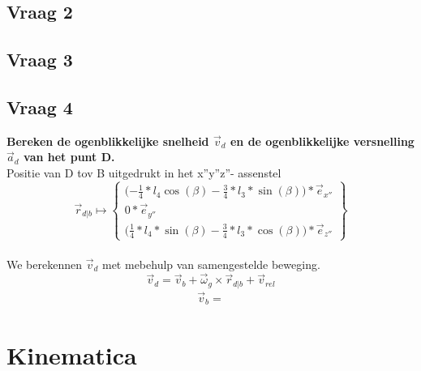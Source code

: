 \documentclass[a4paper,10pt]{article}
\begin{document}
\subsection{Vraag 2}

\subsection{Vraag 3}


\subsection{Vraag 4}
\textbf{Bereken de ogenblikkelijke snelheid $\vec{v}_d$ en de ogenblikkelijke versnelling $\vec{a}_d$ van het punt D.}\\
Positie van D tov B uitgedrukt in het x''y''z''- assenstel\\
\begin{equation}
	\vec{r}_{d|b} \mapsto \begin{Bmatrix}
	\Big({-\frac{1}{4}} * l_4 \cos(\beta)-\frac{3}{4}*l_3*\sin(\beta)\Big)*\vec{e}_{x''}\\
	0 * \vec{e}_{y''}\\
	\Big (\frac{1}{4}*l_4 *\sin(\beta) - \frac{3}{4}*l_3*\cos(\beta)\Big) * \vec{e}_{z''}
	\end{Bmatrix}
\end{equation}\\
We berekennen $\vec{v}_d$ met mebehulp van samengestelde beweging.\\
\begin{equation}
\vec{v}_d = \vec{v}_b + \vec{\omega}_g \times \vec{r}_{d|b}  +\vec{v}_{rel}
\end{equation}
\begin{eqnarray}
\vec{v}_b = 
\end{eqnarray}

\section{Kinematica}
\end{document}
